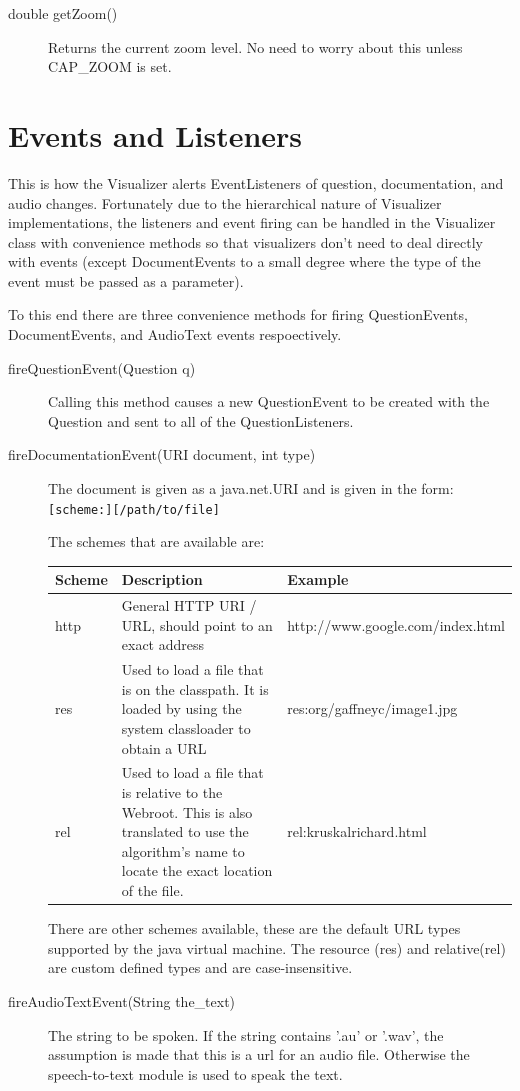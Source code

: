 \documentclass[11pt,letterpaper]{book}
\begin{document}
\begin{description}
\item[double getZoom()] 
  Returns the current zoom level.
  No need to worry about this unless CAP\_ZOOM is set.
\end{description}

\section{Events and Listeners}
This is how the Visualizer alerts EventListeners of question,
documentation, and audio changes. Fortunately due to the hierarchical
nature of Visualizer implementations, the listeners and event firing
can be handled in the Visualizer class with convenience methods so
that visualizers don’t need to deal directly with events (except
DocumentEvents to a small degree where the type of the event must be
passed as a parameter).

To this end there are three convenience methods for firing
QuestionEvents, DocumentEvents, and AudioText events respoectively.

\begin{description}


\item[fireQuestionEvent(Question q)]  Calling this method causes a new
  QuestionEvent to be created with the Question and sent to all of the
  QuestionListeners.


\item[fireDocumentationEvent(URI document, int type)] The document is
  given as a java.net.URI and is given in the form:
  \verb'[scheme:][/path/to/file]'

The schemes that are available are:
		
\begin{tabular}{|l|p{2.0in}|l|}
\hline  

Scheme	& Description	& Example \\ \hline
http	& General HTTP URI / URL, should point to an exact address	& http://www.google.com/index.html \\ \hline
res	& Used to load a file that is on the classpath. It is loaded by using the system classloader to obtain a URL	 & res:org/gaffneyc/image1.jpg \\ \hline
rel	& Used to load a file that is relative to the Webroot. This is also translated to use the algorithm’s name to locate the exact location of the file.	& rel:kruskalrichard.html \\ \hline
\end{tabular}

There are other schemes available, these are the default URL types
supported by the java virtual machine. The resource (res) and
relative(rel) are custom defined types and are case-insensitive.

\item[fireAudioTextEvent(String the\_text)] The string to be
  spoken. If the string contains '.au' or '.wav', the assumption is
  made that this is a url for an audio file. Otherwise the
  speech-to-text module is used to speak the text.



\end{description}
\end{document}

